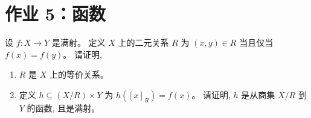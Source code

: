 
\newpage
\section{作业 5：函数}

\begin{problem}[函数与等价关系]
  设 $f: X \to Y$ 是满射。
  定义 $X$ 上的二元关系 $R$ 为 $(x, y) \in R$ 当且仅当 $f(x) = f(y)$。
  请证明,
  \begin{enumerate}[(1)]
    \item $R$ 是 $X$ 上的等价关系。
    \item 定义 $h \subseteq (X/R) \times Y$ 为 $h([x]_{R}) = f(x)$。
      请证明, $h$ 是从商集 $X/R$ 到 $Y$ 的函数, 且是满射。
  \end{enumerate}
\end{problem}

